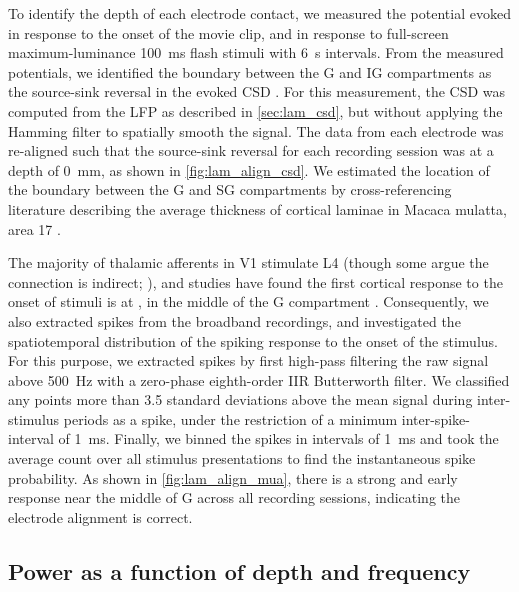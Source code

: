 To identify the depth of each electrode contact, we measured the potential evoked in response to the onset of the movie clip, and in response to full-screen maximum-luminance \SI{100}{\milli\second} flash stimuli with \SI{6}{\second} intervals.
From the measured potentials, we identified the boundary between the \ac{G} and \ac{IG} compartments as the source-sink reversal in the evoked \ac{CSD} \citep{Mitzdorf1979,Mitzdorf1985}.
For this measurement, the \ac{CSD} was computed from the \ac{LFP} as described in \autoref{sec:lam_csd}, but without applying the Hamming filter to spatially smooth the signal.
The data from each electrode was re-aligned such that the source-sink reversal for each recording session was at a depth of \SI{0}{\milli\metre}, as shown in \autoref{fig:lam_align_csd}.
We estimated the location of the boundary between the \ac{G} and \ac{SG} compartments by cross-referencing literature describing the average thickness of cortical laminae in Macaca mulatta, area 17 \citep{Lund1973,OKusky1982}.

The majority of thalamic afferents in \ac{V1} stimulate \ac{L4} (though some argue the connection is indirect; \citealp{Hansen2012}), and studies have found the first cortical response to the onset of stimuli is at , in the middle of the \ac{G} compartment \citep{Callaway1998}.
Consequently, we also extracted spikes from the broadband recordings, and investigated the spatiotemporal distribution of the spiking response to the onset of the stimulus.
For this purpose, we extracted spikes by first high-pass filtering the raw signal above \SI{500}{Hz} with a zero-phase eighth-order \ac{IIR} Butterworth filter.
We classified any points more than \num{3.5} standard deviations above the mean signal during inter-stimulus periods as a spike, under the restriction of a minimum inter-spike-interval of \SI{1}{\milli\second}.
Finally, we binned the spikes in intervals of \SI{1}{\milli\second} and took the average count over all stimulus presentations to find the instantaneous spike probability.
As shown in \autoref{fig:lam_align_mua}, there is a strong and early response near the middle of \ac{G} across all recording sessions, indicating the electrode alignment is correct.


\subsection{Power as a function of depth and frequency}
\label{sec:lam_power_method}

